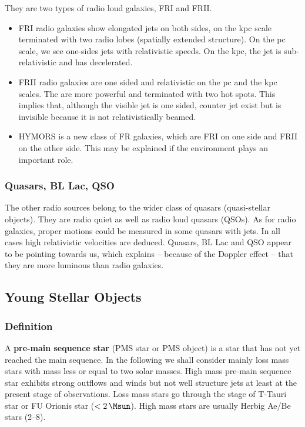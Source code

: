 \documentclass[10pt,a4paper,english]{article}
\begin{document}
They are two types of radio loud galaxies, FRI and FRII.
\begin{itemize}
    \item FRI radio galaxies show elongated jets on both sides, on the kpc
          scale terminated with two radio lobes (spatially extended structure).
          On the pc scale, we see one-sides jets with relativistic speeds. On
          the kpc, the jet is sub-relativistic and has decelerated.
    \item FRII radio galaxies are one sided and relativistic on the pc and the
          kpc scales. The are more powerful and terminated with two hot spots.
          This implies that, although the visible jet is one sided, counter jet
          exist but is invisible because it is not relativistically beamed.
    \item HYMORS is a new class of FR galaxies, which are FRI on one side and
          FRII on the other side. This may be explained if the environment
          plays an important role.
\end{itemize}

\subsubsection{Quasars, BL Lac, QSO}

The other radio sources belong to the wider class of quasars (quasi-stellar
objects). They are radio quiet as well as radio loud quasars (QSOs). As for
radio galaxies, proper motions could be measured in some quasars with jets. In
all cases high relativistic velocities are deduced. Quasars, BL Lac and QSO
appear to be pointing towards us, which explains – because of the Doppler
effect – that they are more luminous than radio galaxies.

\subsection{Young Stellar Objects}

\subsubsection{Definition}

A \textbf{pre-main sequence star} (PMS star or PMS object) is a star that has
not yet reached the main sequence. In the following we shall consider mainly
loss mass stars with mass less or equal to two solar masses. High mass pre-main
sequence star exhibits strong outflows and winds but not well structure jets at
least at the present stage of observations. Loss mass stars go through the
stage of T-Tauri star or FU Orionis star ($<\SI{2}{\Msun}$). High mass stars
are usually Herbig Ae/Be stars (\SIrange{2}{8}{\Msun}).
\end{document}

